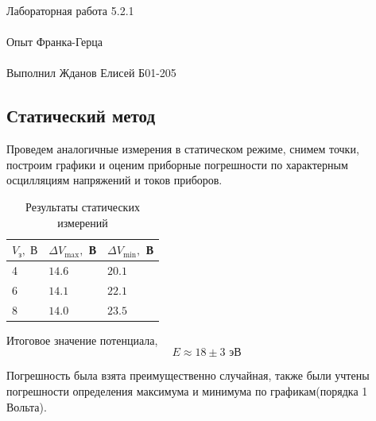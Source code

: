 \documentclass{astroedu-lab}
\begin{document}
\begin{problem}{\huge Лабораторная работа 5.2.1\\\\Опыт Франка-Герца\\\\Выполнил Жданов Елисей Б01-205}

\subsection{Статический метод}

Проведем аналогичные измерения в статическом режиме, снимем точки, построим графики и оценим приборные погрешности по характерным осцилляциям напряжений и токов приборов.

 \begin{table}[h]
 	\centering
 	\begin{tabular}{|l|l|l|}
 		\hline
 		$V_{\text{з}}, \;В$ & $\Delta V_{\max}, $ В & $\Delta V_{\min}, $ В \\ \hline
4  & $14.6$   & $20.1$ 			  \\ \hline
6  & $14.1$   & $22.1$       \\ \hline
8  & $14.0$    & $23.5$      \\ \hline
 	\end{tabular}
 \caption{Результаты статических измерений}
 \end{table}
 
Итоговое значение потенциала,
\begin{equation}\label{key}
	E \approx 18 \pm 3 \text{ эВ}
\end{equation}

Погрешность была взята преимущественно случайная, также были учтены погрешности определения максимума и минимума по графикам(порядка 1 Вольта).





\end{problem}
\end{document}
